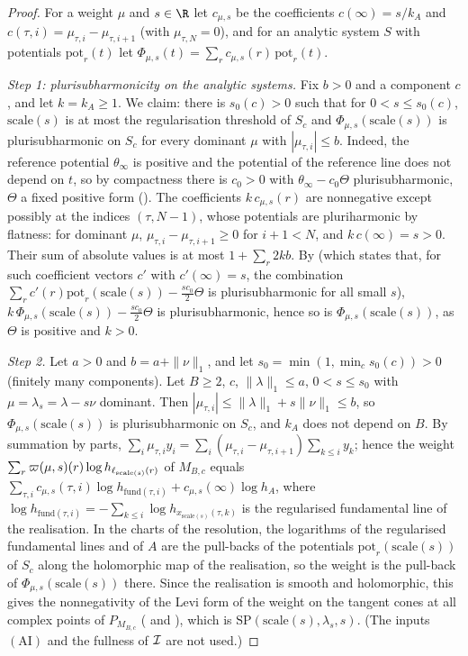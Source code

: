 \begin{proof}
For a weight $\mu$ and $s\in\R$ let $c_{\mu,s}$ be the coefficients $c(\infty)=s/k_A$ and $c(\tau,i)=\mu_{\tau,i}-\mu_{\tau,i+1}$
(with $\mu_{\tau,N}=0$), and for an analytic system $S$ with potentials $\mathrm{pot}_r(t)$ let
$\Phi_{\mu,s}(t)=\sum_rc_{\mu,s}(r)\,\mathrm{pot}_r(t)$.

\emph{Step 1: plurisubharmonicity on the analytic systems.} Fix $b>0$ and a component $c$, and let $k=k_A\ge1$. We claim:
there is $s_0(c)>0$ such that for $0<s\le s_0(c)$, $\mathrm{scale}(s)$ is at most the regularisation threshold of $S_c$ and
$\Phi_{\mu,s}(\mathrm{scale}(s))$ is plurisubharmonic on $S_c$ for every dominant $\mu$ with $|\mu_{\tau,i}|\le b$. Indeed,
the reference potential $\theta_\infty$ is positive and the potential of the reference line does not depend on $t$, so
by compactness there is $c_0>0$ with $\theta_\infty-c_0\Theta$ plurisubharmonic, $\Theta$ a fixed positive form
(). The coefficients $k\,c_{\mu,s}(r)$ are nonnegative except possibly at
the indices $(\tau,N-1)$, whose potentials are pluriharmonic by flatness: for dominant $\mu$,
$\mu_{\tau,i}-\mu_{\tau,i+1}\ge0$ for $i+1<N$, and $k\,c(\infty)=s>0$. Their sum of absolute values is at most
$1+\sum_r2kb$. By  (which states that, for such
coefficient vectors $c'$ with $c'(\infty)=s$, the combination $\sum_rc'(r)\mathrm{pot}_r(\mathrm{scale}(s))-\frac{sc_0}2\Theta$
is plurisubharmonic for all small $s$), $k\,\Phi_{\mu,s}(\mathrm{scale}(s))-\frac{sc_0}2\Theta$ is plurisubharmonic, hence
so is $\Phi_{\mu,s}(\mathrm{scale}(s))$, as $\Theta$ is positive and $k>0$.

\emph{Step 2.} Let $a>0$ and $b=a+\|\nu\|_1$, and let $s_0=\min(1,\min_cs_0(c))>0$ (finitely many components). Let $B\ge2$,
$c$, $\|\lambda\|_1\le a$, $0<s\le s_0$ with $\mu=\lambda_s=\lambda-s\nu$ dominant. Then $|\mu_{\tau,i}|\le\|\lambda\|_1+s\|\nu\|_1\le b$, so
$\Phi_{\mu,s}(\mathrm{scale}(s))$ is plurisubharmonic on $S_c$, and $k_A$ does not depend on $B$. By summation by parts,
$\sum_i\mu_{\tau,i}y_i=\sum_i(\mu_{\tau,i}-\mu_{\tau,i+1})\sum_{k\le i}y_k$; hence the weight
$\sum_r\varpi(\mu,s)(r)\log h_{\ell_{\mathrm{scale}(s)}(r)}$ of $M_{B,c}$ equals $\sum_{\tau,i}c_{\mu,s}(\tau,i)\log
h_{\mathrm{fund}(\tau,i)}+c_{\mu,s}(\infty)\log h_A$, where $\log h_{\mathrm{fund}(\tau,i)}=-\sum_{k\le i}\log h_{x_{\mathrm{scale}(s)}(\tau,k)}$
is the regularised fundamental line of the realisation. In the charts of the resolution, the logarithms of the regularised
fundamental lines and of $A$ are the pull-backs of the potentials $\mathrm{pot}_r(\mathrm{scale}(s))$ of $S_c$ along the
holomorphic map of the realisation, so the weight is the pull-back of $\Phi_{\mu,s}(\mathrm{scale}(s))$ there. Since the
realisation is smooth and holomorphic, this gives the nonnegativity of the Levi form of the weight on the tangent cones at all complex points
of $P_{M_{B,c}}$ ( and ),
which is $\mathrm{SP}(\mathrm{scale}(s),\lambda_s,s)$. (The inputs $(\mathrm{AI})$ and the fullness of $\mathcal{I}$ are not used.)
\end{proof}

